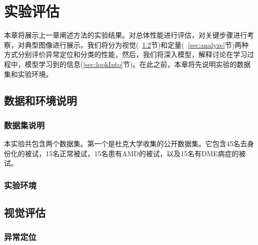 \chapter{实验评估}

    本章将展示上一章阐述方法的实验结果。对总体性能进行评估，对关键步骤进行考察，对典型图像进行展示。我们将分为视觉(~\ref{sec:visualize}节)和定量(~\ref{sec:analyze}节)两种方式分别评价异常定位和分类的性能，然后，我们将深入模型，解释讨论在学习过程中，模型学习到的信息(\ref{sec:lookInto}节)。在此之前，本章将先说明实验的数据集和实验环境。

\section{数据和环境说明}
    \label{sec:data}
    \subsection{数据集说明} %
    本实验共包含两个数据集。第一个是杜克大学\cite{srinivasan2014fully}收集的公开数据集。它包含45名去身份化的被试，15名正常被试，15名患有AMD的被试，以及15名有DME病症的被试。
    \subsection{实验环境}



\section{视觉评估}
    \label{sec:visualize}
    \subsection{异常定位}
